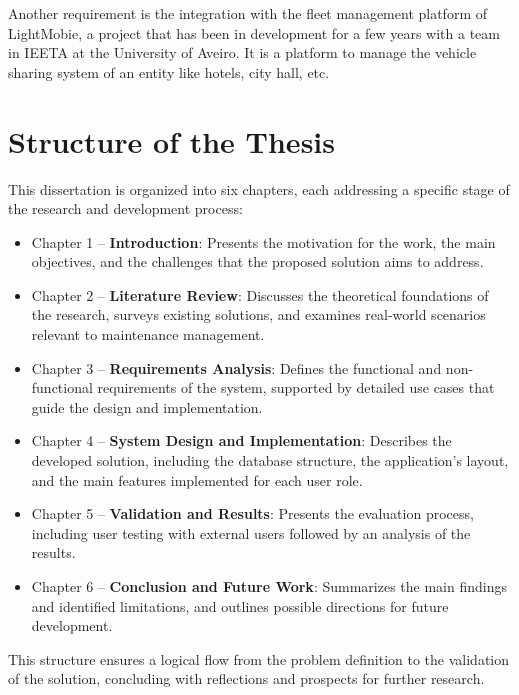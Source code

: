 Another requirement is the integration with the fleet management platform of LightMobie, a project that has been in development for a few years with a team in \ac{IEETA} at the University of Aveiro.
It is a platform to manage the vehicle sharing system of an entity like hotels, city hall, etc.  

\section{Structure of the Thesis}


This dissertation is organized into six chapters, each addressing a specific stage of the research and development process:


\begin{itemize}
    \item Chapter 1 – \textbf{Introduction}: Presents the motivation for the work, the main objectives, and the challenges that the proposed solution aims to address.
    \item Chapter 2 – \textbf{Literature Review}: Discusses the theoretical foundations of the research, surveys existing solutions, and examines real-world scenarios relevant to maintenance management.
    \item Chapter 3 – \textbf{Requirements Analysis}: Defines the functional and non-functional requirements of the system, supported by detailed use cases that guide the design and implementation.
    \item Chapter 4 – \textbf{System Design and Implementation}: Describes the developed solution, including the database structure, the application's layout, and the main features implemented for each user role.
    \item Chapter 5 – \textbf{Validation and Results}: Presents the evaluation process, including user testing with external users followed by an analysis of the results.
    \item Chapter 6 – \textbf{Conclusion and Future Work}: Summarizes the main findings and identified limitations, and outlines possible directions for future development.
\end{itemize}

This structure ensures a logical flow from the problem definition to the validation of the solution, concluding with reflections and prospects for further research.

